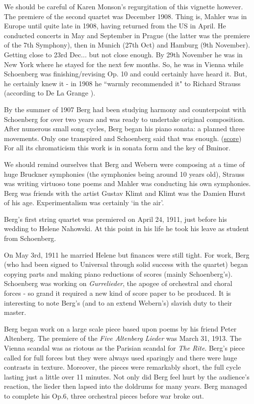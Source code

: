 We should be careful of Karen Monson's  regurgitation of this vignette however. The premiere of the second 
quartet was December 1908. Thing is, Mahler was in Europe until quite late in 1908, having returned from the 
US in April. He conducted concerts in May and September in Prague (the latter was the premiere of the 7th 
Symphony), then in Munich (27th Oct) and Hamburg (9th November). Getting close to 23rd Dec... but not close 
enough. By 29th November he was in New York where he stayed for the next few months. So, he was in Vienna 
while Schoenberg was finishing/revising Op. 10 and could certainly have heard it. But, he certainly knew it - 
in 1908 he ``warmly recommended it" to Richard Strauss (according to De La Grange \citeyearpar{de2007gustav}). 

By the summer of 1907 Berg had been studying harmony and counterpoint with Schoenberg for over two years and was ready to undertake original composition. After numerous small song cycles, Berg began his piano sonata: a planned three movements. Only one transpired and Schoenberg said that was enough. (\href{http://petrucci.mus.auth.gr/imglnks/usimg/7/75/IMSLP234327-SIBLEY1802.21900.4ff7-39087012041663score.pdf}{score})
For all its chromaticism this work is in sonata form and the key of Bminor. 

We should remind ourselves that Berg and Webern were composing at a time of huge Bruckner symphonies (the symphonies being around 10 years old), Strauss was writing virtuoso tone poems and Mahler was conducting his own symphonies. 
Berg was friends with the artist Gustav Klimt and Klimt was the Damien Hurst of his age. Experimentalism was certainly `in the air'.

Berg's first string quartet was premiered on April 24, 1911, just before his wedding to Helene Nahowski. At this point in his life he took his leave as student from Schoenberg. 

On May 3rd, 1911 he married Helene but finances were still tight. For work, Berg (who had been signed to Universal through solid success with the quartet) began copying parts and making piano reductions of scores (mainly Schoenberg's). Schoenberg was working on \textit{Gurrelieder}, the apogee of orchestral and choral forces - so grand it required a new kind of score paper to be produced. It is interesting to note Berg's (and to an extend Webern's) slavish duty to their master.  

Berg began work on a large scale piece based upon poems by his friend Peter Altenberg. The premiere of the \textit{Five Altenberg Lieder} was March 31, 1913. The Vienna scandal was as riotous as the Parisian scandal for \textit{The Rite}. Berg's piece called for full forces but they were always used sparingly and there were huge contrasts in texture. Moreover, the pieces were remarkably short, the full cycle lasting just a little over 11 minutes. Not only did Berg feel hurt by the audience's reaction, the lieder then lapsed into the doldrums for many years. Berg managed to complete his Op.6, three orchestral pieces before war broke out. 

